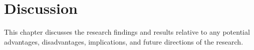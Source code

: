 

\chapter{Discussion} \label{discussion}

This chapter discusses the research findings and results relative to any potential advantages, disadvantages, implications, and future directions of the research.
